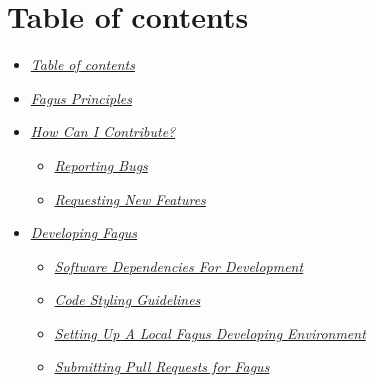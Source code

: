 \documentclass[a4paper,10pt,english]{sphinxmanual}
\begin{document}
\section{Table of contents}
\label{\detokenize{CONTRIBUTING:table-of-contents}}

\begin{itemize}
\item {}
\sphinxAtStartPar
{\hyperref[\detokenize{CONTRIBUTING:table-of-contents}]{\emph{Table of contents}}}

\item {}
\sphinxAtStartPar
{\hyperref[\detokenize{CONTRIBUTING:fagus-principles}]{\emph{Fagus Principles}}}

\item {}
\sphinxAtStartPar
{\hyperref[\detokenize{CONTRIBUTING:how-can-i-contribute}]{\emph{How Can I Contribute?}}}
\begin{itemize}
\item {}
\sphinxAtStartPar
{\hyperref[\detokenize{CONTRIBUTING:reporting-bugs}]{\emph{Reporting Bugs}}}

\item {}
\sphinxAtStartPar
{\hyperref[\detokenize{CONTRIBUTING:requesting-new-features}]{\emph{Requesting New Features}}}

\end{itemize}

\item {}
\sphinxAtStartPar
{\hyperref[\detokenize{CONTRIBUTING:developing-fagus}]{\emph{Developing Fagus}}}
\begin{itemize}
\item {}
\sphinxAtStartPar
{\hyperref[\detokenize{CONTRIBUTING:software-dependencies-for-development}]{\emph{Software Dependencies For Development}}}

\item {}
\sphinxAtStartPar
{\hyperref[\detokenize{CONTRIBUTING:code-styling-guidelines}]{\emph{Code Styling Guidelines}}}

\item {}
\sphinxAtStartPar
{\hyperref[\detokenize{CONTRIBUTING:setting-up-a-local-fagus-developing-environment}]{\emph{Setting Up A Local Fagus Developing Environment}}}

\item {}
\sphinxAtStartPar
{\hyperref[\detokenize{CONTRIBUTING:submitting-pull-requests-for-fagus}]{\emph{Submitting Pull Requests for Fagus}}}

\end{itemize}

\end{itemize}
\end{document}
